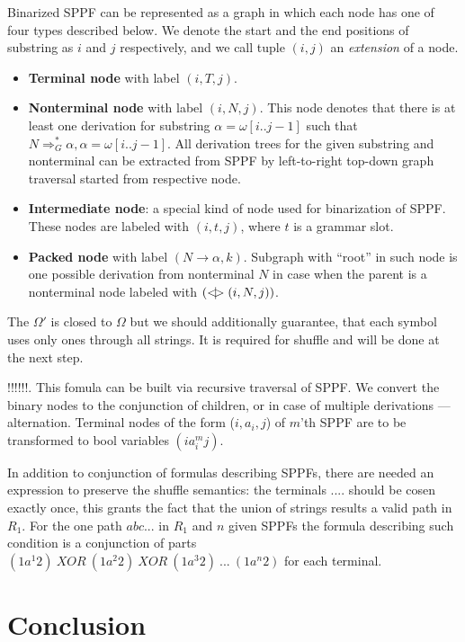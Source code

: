 Binarized SPPF can be represented as a graph in which each node has one of four types described below.
We denote the start and the end positions of substring as $i$ and $j$ respectively, and we call tuple $(i,j)$ an \textit{extension} of a node.

\begin{itemize}
    \item \textbf{Terminal node} with label $(i, T, j)$.
    \item \textbf{Nonterminal node} with label $(i, N, j)$. 
    This node denotes that there is at least one derivation for substring $\alpha=\omega[i..j-1]$ such that $N \Rightarrow^*_G \alpha, \alpha = \omega[i..j-1] $.
    All derivation trees for the given substring and nonterminal can be extracted from SPPF by left-to-right top-down graph traversal started from respective node.     
    \item \textbf{Intermediate node}: a special kind of node used for binarization of SPPF. These nodes are labeled with $(i,t,j)$, where $t$ is a grammar slot.
    \item \textbf{Packed node} with label $(N \rightarrow \alpha, k)$. 
    Subgraph with ``root'' in such node is one possible derivation from nonterminal $N$ in case when the parent is a nonterminal node labeled with $(<\mkern-9mu | \mkern-9mu> (i, N, j))$.
    
\end{itemize}

The $\Omega'$ is closed to $\Omega$ but we should additionally guarantee, that each symbol uses only ones through all strings.
It is required for shuffle and will be done at the next step.


!!!!!!. This fomula 
can be built via recursive traversal of SPPF. We convert the binary nodes to the conjunction of children, or in case of multiple 
derivations --- alternation. Terminal nodes of the form ($i,a_i,j$) of $m$'th SPPF are to be transformed to bool
variables $(ia_i^mj)$.

In addition to conjunction of formulas describing SPPFs, there are needed an expression to preserve the
shuffle semantics: the terminals .... should be cosen exactly once, this grants the fact that the union of strings results a valid 
path in $R_1$. For the one path $a b c ...$ in $R_1$ and $n$ given SPPFs the formula describing such condition is a 
conjunction of parts $(1a^1 2)\ XOR\ (1a^2 2)\ XOR\ (1a^3 2)\ ...\ (1a^n 2) $ for each terminal.


\section{Conclusion}

